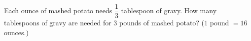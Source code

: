 Each ounce of mashed potato needs $\dfrac13$ tablespoon of gravy. How many tablespoons of gravy are needed for $3$ pounds of mashed potato? ($1$ pound $=16$ ounces.)
